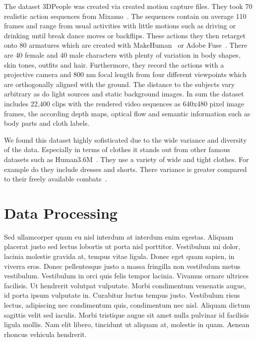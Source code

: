 The dataset 3DPeople was created via created motion capture files.
They took 70 realistic action sequences from Mixamo~\cite{mixamomotionpac}.
The sequences contain on average 110 frames and range from usual activities with little motions such as driving
or drinking until break dance moves or backflips.
These actions they then retarget onto 80 armatures which are created with MakeHuman~\cite{makehuman} or Adobe Fuse~\cite{adobefuse}.
There are 40 female and 40 male characters with plenty of variation in body shapes, skin tones, outfits and hair.
Furthermore, they record the actions with a projective camera and 800 nm focal length from four different viewpoints
which are orthogonally aligned with the ground.
The distance to the subjects vary arbitrary as do light sources and static background images.
In sum the dataset includes 22,400 clips with the rendered video sequences as 640x480 pixel image frames, the according
depth maps, optical flow and semantic information such as body parts and cloth labels.

We found this dataset highly sofisticated due to the wide variance and diversity of the data.
Especially in terms of clothes it stands out from other famous datasets such as Human3.6M~\cite{humaneva}.
They use a variety of wide and tight clothes. For example do they include dresses and shorts.
There variance is greater compared to their freely available combats~\cite{human36m, humaneva}.



\section{Data Processing}

Sed ullamcorper quam eu nisl interdum at interdum enim egestas. Aliquam placerat justo sed lectus lobortis ut porta
nisl porttitor. Vestibulum mi dolor, lacinia molestie gravida at, tempus vitae ligula. Donec eget quam sapien, in
viverra eros. Donec pellentesque justo a massa fringilla non vestibulum metus vestibulum. Vestibulum in orci quis
felis tempor lacinia. Vivamus ornare ultrices facilisis. Ut hendrerit volutpat vulputate. Morbi condimentum venenatis
augue, id porta ipsum vulputate in. Curabitur luctus tempus justo. Vestibulum risus lectus, adipiscing nec
condimentum quis, condimentum nec nisl. Aliquam dictum sagittis velit sed iaculis. Morbi tristique augue sit amet
nulla pulvinar id facilisis ligula mollis. Nam elit libero, tincidunt ut aliquam at, molestie in quam. Aenean rhoncus
vehicula hendrerit.

